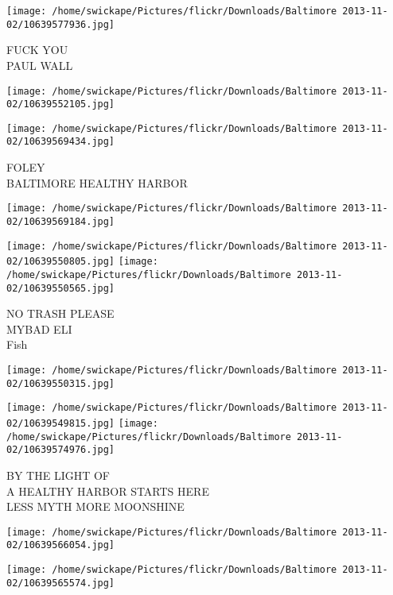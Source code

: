 \documentclass[10pt,letterpaper]{article}
\begin{document}
\vspace{0.25in}
\texttt{[image: /home/swickape/Pictures/flickr/Downloads/Baltimore 2013-11-02/10639577936.jpg]}

FUCK YOU\\
PAUL WALL\\
\pagebreak

\texttt{[image: /home/swickape/Pictures/flickr/Downloads/Baltimore 2013-11-02/10639552105.jpg]}

\vspace{0.25in}
\texttt{[image: /home/swickape/Pictures/flickr/Downloads/Baltimore 2013-11-02/10639569434.jpg]}

FOLEY\\
BALTIMORE HEALTHY HARBOR\\
\pagebreak

\texttt{[image: /home/swickape/Pictures/flickr/Downloads/Baltimore 2013-11-02/10639569184.jpg]}

\vspace{0.25in}
\texttt{[image: /home/swickape/Pictures/flickr/Downloads/Baltimore 2013-11-02/10639550805.jpg]}
\texttt{[image: /home/swickape/Pictures/flickr/Downloads/Baltimore 2013-11-02/10639550565.jpg]}

NO TRASH PLEASE\\
MYBAD ELI\\
Fish\\
\pagebreak

\texttt{[image: /home/swickape/Pictures/flickr/Downloads/Baltimore 2013-11-02/10639550315.jpg]}

\vspace{0.25in}
\texttt{[image: /home/swickape/Pictures/flickr/Downloads/Baltimore 2013-11-02/10639549815.jpg]}
\texttt{[image: /home/swickape/Pictures/flickr/Downloads/Baltimore 2013-11-02/10639574976.jpg]}

BY THE LIGHT OF\\
A HEALTHY HARBOR STARTS HERE\\
LESS MYTH MORE MOONSHINE\\
\pagebreak

\texttt{[image: /home/swickape/Pictures/flickr/Downloads/Baltimore 2013-11-02/10639566054.jpg]}

\vspace{0.25in}
\texttt{[image: /home/swickape/Pictures/flickr/Downloads/Baltimore 2013-11-02/10639565574.jpg]}
\end{document}
